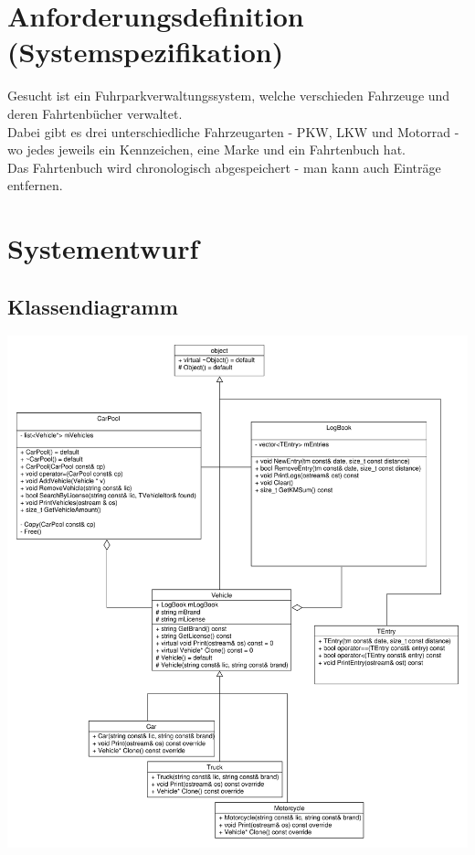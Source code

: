 \newpage
\section{Anforderungsdefinition (Systemspezifikation)}

Gesucht ist ein Fuhrparkverwaltungssystem, welche verschieden Fahrzeuge und deren Fahrtenbücher verwaltet.\\
Dabei gibt es drei unterschiedliche Fahrzeugarten - PKW, LKW und Motorrad - wo jedes jeweils ein Kennzeichen, eine Marke und ein Fahrtenbuch hat.\\
Das Fahrtenbuch wird chronologisch abgespeichert - man kann auch Einträge entfernen. 


\section{Systementwurf}

\subsection{Klassendiagramm}
 \includegraphics[scale = 0.50]{UML-Diagram.pdf}

